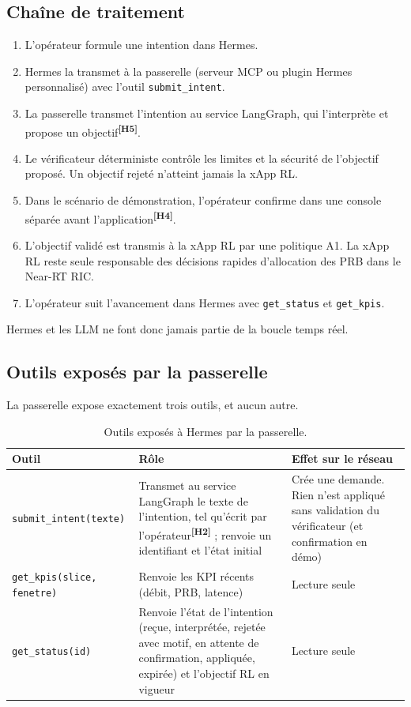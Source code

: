 \documentclass[11pt,a4paper]{article}
\newcommand{\hyp}[1]{\textsuperscript{\textbf{[H#1]}}}
\newcommand{\tool}[1]{\texttt{#1}}
\begin{document}
\subsection{Chaîne de traitement}

\begin{enumerate}
  \item L'opérateur formule une intention dans Hermes.
  \item Hermes la transmet à la passerelle (serveur MCP ou plugin Hermes personnalisé)
        avec l'outil \tool{submit\_intent}.
  \item La passerelle transmet l'intention au service LangGraph, qui l'interprète et propose un objectif\hyp{5}.
  \item Le vérificateur déterministe contrôle les limites et la sécurité de l'objectif
        proposé. Un objectif rejeté n'atteint jamais la xApp RL.
  \item Dans le scénario de démonstration, l'opérateur confirme dans une console séparée
        avant l'application\hyp{4}.
  \item L'objectif validé est transmis à la xApp RL par une politique A1. La xApp RL reste
        seule responsable des décisions rapides d'allocation des PRB dans le Near-RT RIC.
  \item L'opérateur suit l'avancement dans Hermes avec \tool{get\_status} et \tool{get\_kpis}.
\end{enumerate}

Hermes et les LLM ne font donc jamais partie de la boucle temps réel.

\subsection{Outils exposés par la passerelle}

La passerelle expose exactement trois outils, et aucun autre.

\begin{table}[H]
\centering\small
\begin{tabularx}{\textwidth}{@{}P{3.8cm}LL@{}}
\toprule
Outil & Rôle & Effet sur le réseau\\
\midrule
\tool{submit\_intent(texte)} & Transmet au service LangGraph le texte de l'intention, tel qu'écrit par l'opérateur\hyp{2} ; renvoie un identifiant et l'état initial & Crée une demande. Rien n'est appliqué sans validation du vérificateur (et confirmation en démo)\\
\tool{get\_kpis(slice, fenetre)} & Renvoie les KPI récents (débit, PRB, latence) & Lecture seule\\
\tool{get\_status(id)} & Renvoie l'état de l'intention (reçue, interprétée, rejetée avec motif, en attente de confirmation, appliquée, expirée) et l'objectif RL en vigueur & Lecture seule\\
\bottomrule
\end{tabularx}
\caption{Outils exposés à Hermes par la passerelle.}
\end{table}
\end{document}
